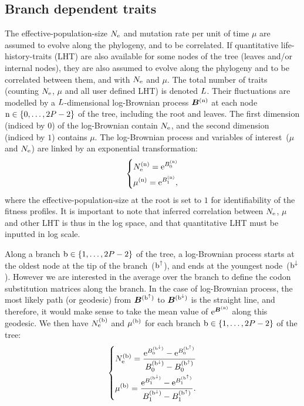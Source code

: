 \subsection{Branch dependent traits}
The \gls{effective-population-size} $N_{\mathrm{e}}$ and mutation rate per unit of time $\mu$ are assumed to evolve along the phylogeny, and to be correlated.
If quantitative life-history-traits (LHT) are also available for some nodes of the tree (leaves and/or internal nodes), they are also assumed to evolve along the phylogeny and to be correlated between them, and with $N_{\mathrm{e}}$ and $\mu$.
The total number of traits (counting $N_{\mathrm{e}}$, $\mu$ and all user defined LHT) is denoted $L$.
Their fluctuations are modelled by a $L$-dimensional log-Brownian process $\bm{B}^{(\text{n})}$ at each node $\text{n} \in \{0, \hdots, 2 P - 2\}$ of the tree, including the root and leaves.
The first dimension (indiced by $0$) of the log-Brownian contain $N_{\mathrm{e}}$, and the second dimension (indiced by $1$) contains $\mu$.
The log-Brownian process and variables of interest~($\mu$ and $N_{\mathrm{e}}$) are linked by an exponential transformation:
\begin{equation}
    \begin{dcases}
        N_{\mathrm{e}}^{(\text{n})} = \mathrm{e}^{ B_{0}^{(\text{n})} } \\
        \mu^{(\text{n})} = \mathrm{e}^{ B_{1}^{(\text{n})} },
    \end{dcases}
\end{equation}
where the \gls{effective-population-size} at the root is set to $1$ for identifiability of the fitness profiles.
It is important to note that inferred correlation between $N_{\mathrm{e}}$, $\mu$ and other LHT is thus in the log space, and that quantitative LHT must be inputted in log scale.

Along a branch $\text{b} \in \{1, \hdots, 2 P - 2\}$ of the tree, a log-Brownian process starts at the oldest node at the tip of the branch~($\text{b}^{\uparrow}$), and ends at the youngest node~($\text{b}^{\downarrow}$).
However we are interested in the average over the branch to define the \gls{codon} \gls{substitution} matrices along the branch.
In the case of log-Brownian process, the most likely path (or geodesic) from $\bm{B}^{(\text{b}^{\uparrow})}$ to $\bm{B}^{(\text{b}^{\downarrow})}$ is the straight line, and therefore, it would make sense to take the mean value of $\mathrm{e}^{\bm{B}^{(\text{n})}}$ along this geodesic.
We then have $N_{\mathrm{e}}^{(\text{b})}$ and $\mu^{(\text{b})}$ for each branch $\text{b} \in \{1, \hdots, 2 P - 2\}$ of the tree:
\begin{equation}
    \label{eq:branchNemu}
    \begin{dcases}
        \Ne\branchexp = \dfrac{\e^{\brownian_{0}^{(\nodeDown)}} - \e^{\brownian_{0}^{(\nodeUp)}}}{\brownian_{0}^{(\nodeDown)} - \brownian_{0}^{(\nodeUp)}} \\
        \mu\branchexp = \dfrac{\e^{\brownian_{1}^{(\nodeDown)}} - \e^{\brownian_{1}^{(\nodeUp)}}}{\brownian_{1}^{(\nodeDown)} - \brownian_{1}^{(\nodeUp)}}.
    \end{dcases}
\end{equation}

